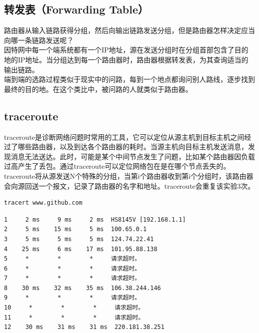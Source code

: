 \vspace{0.5cm}

\subsection{转发表（Forwarding Table）}

路由器从输入链路获得分组，然后向输出链路发送分组，但是路由器怎样决定应当向哪一条链路发送呢？\\

因特网中每一个端系统都有一个IP地址，源在发送分组时在分组首部包含了目的地的IP地址。当分组达到每一个路由器时，路由器根据转发表，为其查询适当的输出链路。\\

端到端的选路过程类似于现实中的问路，每到一个地点都询问别人路线，逐步找到最终的目的地。在这个类比中，被问路的人就类似于路由器。\\

\subsection{traceroute}

traceroute是诊断网络问题时常用的工具，它可以定位从源主机到目标主机之间经过了哪些路由器，以及到达各个路由器的耗时。当源主机向目标主机发送消息，发现消息无法送达。此时，可能是某个中间节点发生了问题，比如某个路由器因负载过高产生了丢包。通过traceroute可以定位网络包在是在哪个节点丢失的。\\

traceroute将从源发送N个特殊的分组，当第i个路由器收到第i个分组时，该路由器会向源回送一个报文，记录了路由器的名字和地址。traceroute会重复该实验3次。\\


\begin{lstlisting}
tracert www.github.com
\end{lstlisting}

\begin{tcolorbox}
    \begin{verbatim}
1     2 ms     9 ms     2 ms  HS8145V [192.168.1.1]
2     5 ms    15 ms     5 ms  100.65.0.1
3     5 ms     5 ms     5 ms  124.74.22.41
4    25 ms     6 ms    17 ms  101.95.88.138
5     *        *        *     请求超时。
6     *        *        *     请求超时。
7     *        *        *     请求超时。
8    30 ms    32 ms    35 ms  106.38.244.146
9     *        *        *     请求超时。
10     *        *        *     请求超时。
11     *        *        *     请求超时。
12    30 ms    31 ms    31 ms  220.181.38.251
	\end{verbatim}
\end{tcolorbox}

